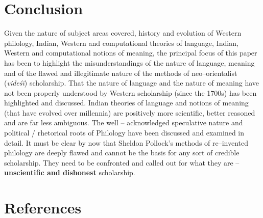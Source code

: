 \section*{Conclusion}

Given the nature of subject areas covered, history and evolution of Western philology, Indian, Western and computational theories of language, Indian, Western and computational notions of meaning, the principal focus of this paper has been to highlight the misunderstandings of the nature of language, meaning and of the flawed and illegitimate nature of the methods of neo–orientalist (\textit{videśī}) scholarship. That the nature of language and the nature of meaning have not been properly understood by Western scholarship (since the 1700s) has been highlighted and discussed. Indian theories of language and notions of meaning (that have evolved over millennia) are positively more scientific, better reasoned and are far less ambiguous. The well – acknowledged speculative nature and political / rhetorical roots of Philology have been discussed and examined in detail. It must be clear by now that Sheldon Pollock’s methods of re–invented philology are deeply flawed and cannot be the basis for any sort of credible scholarship. They need to be confronted and called out for what they are – \textbf{unscientific and dishonest} scholarship.

\newpage


\section*{References}

